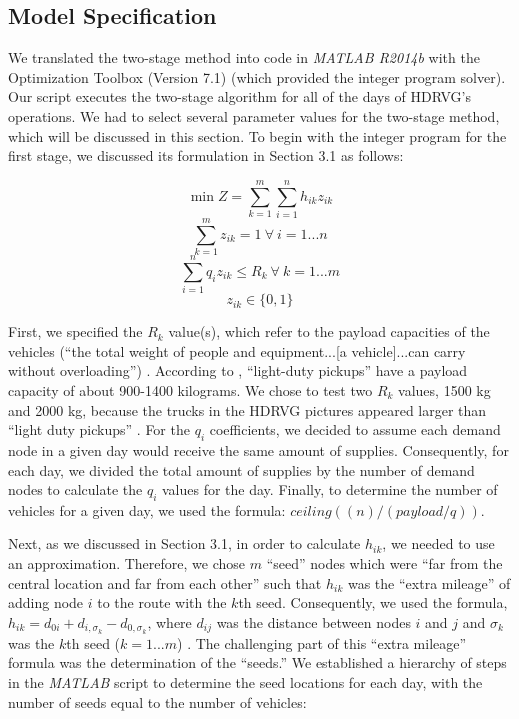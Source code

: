 \documentclass[11pt]{article}
\begin{document}
\subsection{Model Specification}

We translated the two-stage method into code in \textit{MATLAB R2014b} with the Optimization Toolbox (Version 7.1) (which provided the integer program solver).  Our script executes the two-stage algorithm for all of the days of HDRVG's operations.  We had to select several parameter values for the two-stage method, which will be discussed in this section.  To begin with the integer program for the first stage, we discussed its formulation in Section 3.1 as follows: 

\[ \min Z = \sum\limits_{k=1}^{m} \sum\limits_{i=1}^{n} h_{ik} z_{ik} \]
\[ \sum\limits_{k=1}^{m} z_{ik} = 1\ \forall\ i=1...n \]
\[ \sum\limits_{i=1}^{n} q_{i} z_{ik} \leq R_{k}\ \forall\ k = 1...m \]
\[ z_{ik} \in \{0,1\} \]

\noindent First, we specified the $R_{k}$ value(s), which refer to the payload capacities of the vehicles (``the total weight of people and equipment...[a vehicle]...can carry without overloading'') \cite{payload_1}.  According to \cite{payload_2}, ``light-duty pickups'' have a payload capacity of about 900-1400 kilograms.  We chose to test two $R_{k}$ values, 1500 kg and 2000 kg, because the trucks in the HDRVG pictures appeared larger than ``light duty pickups'' \cite{FB_HDRVG}.  For the $q_{i}$ coefficients, we decided to assume each demand node in a given day would receive the same amount of supplies.  Consequently, for each day, we divided the total amount of supplies by the number of demand nodes to calculate the $q_{i}$ values for the day.  Finally, to determine the number of vehicles for a given day, we used the formula: $ceiling((n)/(payload/q))$. 

Next, as we discussed in Section 3.1, in order to calculate $h_{ik}$, we needed to use an approximation.  Therefore, we chose $m$ ``seed'' nodes which were ``far from the central location and far from each other'' such that $h_{ik}$ was the ``extra mileage'' of adding node $i$ to the route with the $k$th seed.  Consequently, we used the formula, $h_{ik} = d_{0i} + d_{i,\sigma_{k}} - d_{0,\sigma_{k}}$, where $d_{ij}$ was the distance between nodes $i$ and $j$ and $\sigma_{k}$ was the $k$th seed ($k = 1...m$) \cite{intro_logistics_book}.  The challenging part of this ``extra mileage'' formula was the determination of the ``seeds.''  We established a hierarchy of steps in the \textit{MATLAB} script to determine the seed locations for each day, with the number of seeds equal to the number of vehicles:
\end{document}
